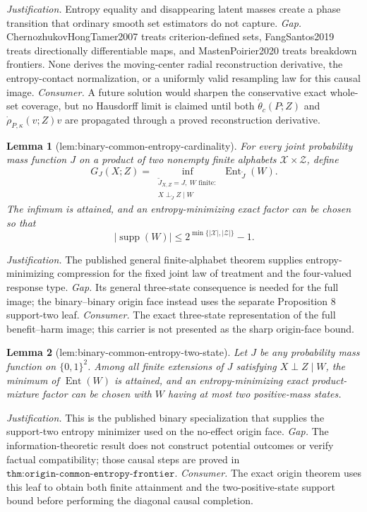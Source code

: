\documentclass{article}
\newtheorem{lemma}{Lemma}
\begin{document}
\par\smallskip\noindent \textit{Justification.} Entropy equality and disappearing latent masses create a phase transition that ordinary smooth set estimators do not capture. \textit{Gap.} ChernozhukovHongTamer2007 treats criterion-defined sets, FangSantos2019 treats directionally differentiable maps, and MastenPoirier2020 treats breakdown frontiers. None derives the moving-center radial reconstruction derivative, the entropy-contact normalization, or a uniformly valid resampling law for this causal image. \textit{Consumer.} A future solution would sharpen the conservative exact whole-set coverage, but no Hausdorff limit is claimed until both \(\dot\theta_c(P;Z)\) and \(\dot\rho_{P,\kappa}(v;Z)v\) are propagated through a proved reconstruction derivative.

\begin{lemma}[lem:binary-common-entropy-cardinality]\label{lem:binary-common-entropy-cardinality}
For every joint probability mass function \(J\) on a product of two nonempty finite alphabets \(\mathcal X\times\mathcal Z\), define \[G_J(X;Z)=\inf_{\substack{\widetilde J_{X,Z}=J,\ W\text{ finite}:\\ X\perp_{\widetilde J}Z\mid W}}\operatorname{Ent}_{\widetilde J}(W).\] The infimum is attained, and an entropy-minimizing exact factor can be chosen so that \[|\operatorname{supp}(W)|\leq 2^{\min\{|\mathcal X|,|\mathcal Z|\}}-1.\]
\end{lemma}
\par\smallskip\noindent \textit{Justification.} The published general finite-alphabet theorem supplies entropy-minimizing compression for the fixed joint law of treatment and the four-valued response type. \textit{Gap.} Its general three-state consequence is needed for the full image; the binary--binary origin face instead uses the separate Proposition 8 support-two leaf. \textit{Consumer.} The exact three-state representation of the full benefit--harm image; this carrier is not presented as the sharp origin-face bound.

\begin{lemma}[lem:binary-common-entropy-two-state]\label{lem:binary-common-entropy-two-state}
Let \(J\) be any probability mass function on \(\{0,1\}^2\). Among all finite extensions of \(J\) satisfying \(X\perp Z\mid W\), the minimum of \(\operatorname{Ent}(W)\) is attained, and an entropy-minimizing exact product-mixture factor can be chosen with \(W\) having at most two positive-mass states.
\end{lemma}
\par\smallskip\noindent \textit{Justification.} This is the published binary specialization that supplies the support-two entropy minimizer used on the no-effect origin face. \textit{Gap.} The information-theoretic result does not construct potential outcomes or verify factual compatibility; those causal steps are proved in \(\texttt{thm:origin-common-entropy-frontier}\). \textit{Consumer.} The exact origin theorem uses this leaf to obtain both finite attainment and the two-positive-state support bound before performing the diagonal causal completion.
\end{document}
